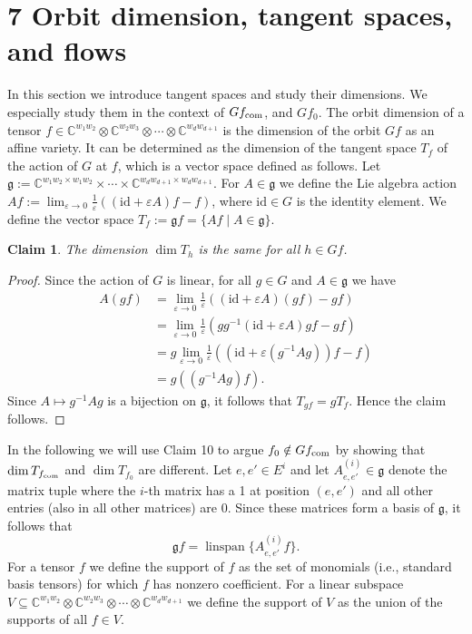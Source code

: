 \documentclass[10pt,a4paper]{article}
\newtheorem{claim}[theorem]{Claim}
\newcommand{\C}{\mathbb C}
\newcommand{\fcom}{f_{\rm com}}
\newcommand{\g}{\mathfrak g}
\DeclareMathOperator{\linspan}{linspan}
\begin{document}
\section*{7 Orbit dimension, tangent spaces, and flows}
In this section we introduce tangent spaces and study their dimensions. We especially study them in the context of $G\fcom$, and $Gf_0$.
The orbit dimension of a tensor $f\in\C^{w_1w_2}\otimes\C^{w_2w_3}\otimes\cdots\otimes\C^{w_dw_{d+1}}$ is the dimension of the orbit $Gf$ as an affine variety. It can be determined as the dimension of the tangent space $T_f$ of the action of $G$ at $f$, which is a vector space defined as follows. Let $\g:=\C^{w_1w_2\times w_1w_2}\times\cdots\times\C^{w_dw_{d+1}\times w_dw_{d+1}}$. For $A\in\g$ we define the Lie algebra action $Af:=\lim_{\varepsilon\to0}\frac1\varepsilon((\mathrm{id}+\varepsilon A)f-f)$, where $\mathrm{id}\in G$ is the identity element. We define the vector space $T_f:=\g f=\{Af\mid A\in\g\}$.
\begin{claim}The dimension $\dim T_h$ is the same for all $h\in Gf$.\end{claim}
\begin{proof}
Since the action of $G$ is linear, for all $g\in G$ and $A\in\g$ we have
\begin{align*}
A(gf)&=\lim_{\varepsilon\to0}\frac1\varepsilon((\mathrm{id}+\varepsilon A)(gf)-gf)\\
&=\lim_{\varepsilon\to0}\frac1\varepsilon(gg^{-1}(\mathrm{id}+\varepsilon A)gf-gf)\\
&=g\lim_{\varepsilon\to0}\frac1\varepsilon((\mathrm{id}+\varepsilon(g^{-1}Ag))f-f)\\
&=g((g^{-1}Ag)f).
\end{align*}
Since $A\mapsto g^{-1}Ag$ is a bijection on $\g$, it follows that $T_{gf}=gT_f$. Hence the claim follows.
\end{proof}
In the following we will use Claim 10 to argue $f_0\notin G\fcom$ by showing that $\dim T_{\fcom}$ and $\dim T_{f_0}$ are different.
Let $e,e'\in E^i$ and let $A^{(i)}_{e,e'}\in\g$ denote the matrix tuple where the $i$-th matrix has a 1 at position $(e,e')$ and all other entries (also in all other matrices) are 0. Since these matrices form a basis of $\g$, it follows that
\[\g f=\linspan\{A^{(i)}_{e,e'}f\}.\]
For a tensor $f$ we define the support of $f$ as the set of monomials (i.e., standard basis tensors) for which $f$ has nonzero coefficient. For a linear subspace $V\subseteq\C^{w_1w_2}\otimes\C^{w_2w_3}\otimes\cdots\otimes\C^{w_dw_{d+1}}$ we define the support of $V$ as the union of the supports of all $f\in V$.
\end{document}
